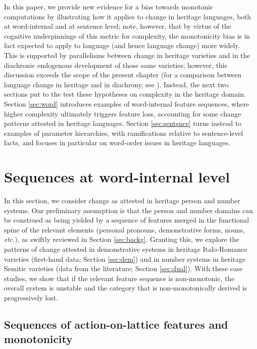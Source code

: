 \documentclass[output=paper]{langscibook}
\begin{document}
In this paper, we provide new evidence for a bias towards monotonic computations by illustrating how it applies to change in heritage languages, both at word-internal and at sentence level; note, however, that by virtue of the cognitive underpinnings of this metric for complexity, the monotonicity bias is in fact expected to apply to language (and hence language change) more widely. This is supported by parallelisms between change in heritage varieties and in the diachronic endogenous development of those same varieties; however, this discussion exceeds the scope of the present chapter (for a comparison between language change in heritage and in diachrony, see \citealt{DAlessandroEtAlIP}). Instead, the next two sections put to the test these hypotheses on complexity in the heritage domain. Section \ref{sec:word} introduces examples of word-internal feature sequences, where higher complexity ultimately triggers feature loss, accounting for some change patterns attested in heritage languages. Section \ref{sec:sentence} turns instead to examples of parameter hierarchies, with ramifications relative to sen\-tence-lev\-el facts, and focuses in particular on word-order issues in heritage languages.


\section{Sequences at word-internal level \label{sec:word}} 

In this section, we consider change as attested in heritage person and number systems. Our preliminary assumption is that the person and number domains can be construed as being yielded by a sequence of features merged in the functional spine of the relevant elements (personal pronouns, demonstrative forms, nouns, \textit{etc.}), as swiftly reviewed in Section \ref{sec:backg}. Granting this, we explore the patterns of change attested in demonstrative systems in heritage Italo-Romance varieties (first-hand data; Section \ref{sec:dem}) and in number systems in heritage Semitic varieties (data from the literature; Section \ref{sec:dual}). With these case studies, we show that if the relevant feature sequence is non-monotonic, the overall system is unstable and the category that is non-monotonically derived is progressively lost. 

\subsection{Sequences of action-on-lattice features and monotonicity\label{sec:backg}}
\end{document}
